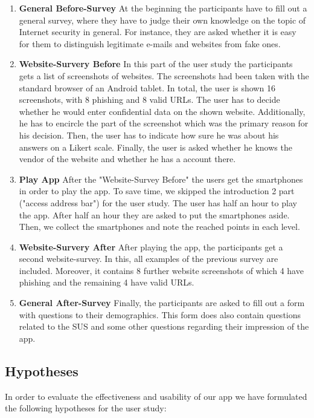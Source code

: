 \begin{enumerate}
	\item \textbf{General Before-Survey} At the beginning the participants have to fill out a general survey, where they have to judge their own knowledge on the topic of Internet security in general.
 For instance, they are asked whether it is easy for them to distinguish legitimate e-mails and websites from fake ones.

	\item \textbf{Website-Survery Before} In this part of the user study the participants gets a list of screenshots of websites.
 The screenshots had been taken with the standard browser of an Android tablet.
 In total, the user is shown 16 screenshots, with 8 phishing and 8 valid URLs.
 The user has to decide whether he would enter confidential data on the shown website.
 Additionally, he has to encircle the part of the screenshot which was the primary reason for his decision.
 Then, the user has to indicate how sure he was about his answers on a Likert scale.
 Finally, the user is asked whether he knows the vendor of the website and whether he has a account there.

	\item \textbf{Play App} After the "Website-Survey Before" the users get the smartphones in order to play the app.
 To save time, we skipped the introduction 2 part ("access address bar") for the user study.
 The user has half an hour to play the app.
 After half an hour they are asked to put the smartphones aside.
 Then, we collect the smartphones and note the reached points in each level.

	\item \textbf{Website-Survery After} After playing the app, the participants get a second website-survey.
 In this, all examples of the previous survey are included.
 Moreover, it contains 8 further website screenshots of which 4 have phishing and the remaining 4 have valid URLs.

	\item \textbf{General After-Survey} Finally, the participants are asked to fill out a form with questions to their demographics.
 This form does also contain questions related to the SUS and some other questions regarding their impression of the app.



\end{enumerate}

\subsection{Hypotheses}
In order to evaluate the effectiveness and usability of our app we have formulated the following hypotheses for the user study:

